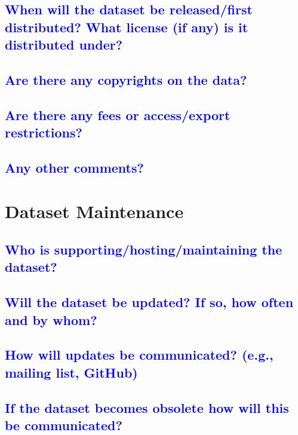 \documentclass[letterpaper, 10 pt, conference]{ieeeconf}  %
\begin{document}
\textcolor{blue}{\subsection{When will the dataset be released/first distributed?
What license (if any) is it distributed under?}}
\lipsum[1]

\textcolor{blue}{\subsection{Are there any copyrights on the data?}}
\lipsum[1]


\textcolor{blue}{\subsection{Are there any fees or access/export restrictions?}}
\lipsum[1]

\textcolor{blue}{\subsection{Any other comments?}}
\lipsum[1]

\section{Dataset Maintenance}

\textcolor{blue}{\subsection{Who is supporting/hosting/maintaining the
dataset?}}
\lipsum[1]

\textcolor{blue}{\subsection{Will the dataset be updated? If so, how often and
by whom?}}
\lipsum[1]

\textcolor{blue}{\subsection{How will updates be communicated? (e.g., mailing
list, GitHub)}}
\lipsum[1]

\textcolor{blue}{\subsection{If the dataset becomes obsolete how will this be
communicated?}}
\lipsum[1]
\end{document}
